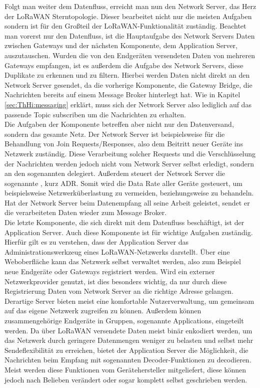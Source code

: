 Folgt man weiter dem Datenfluss, erreicht man nun den Network Server, das Herz der LoRaWAN Sterntopologie. Dieser bearbeitet nicht nur die meisten Aufgaben sondern ist für den Großteil der LoRaWAN-Funktionalität zuständig. Beachtet man vorerst nur den Datenfluss, ist die Hauptaufgabe des Network Servers Daten zwischen Gateways und der nächsten Komponente, dem Application Server, auszutauschen. Wurden die von den Endgeräten versendeten Daten von mehreren Gateways empfangen, ist es außerdem die Aufgabe des Network Servers, diese Duplikate zu erkennen und zu filtern. Hierbei werden Daten nicht direkt an den Network Server gesendet, da die vorherige Komponente, die Gateway Bridge, die Nachrichten bereits auf einem Message Broker hinterlegt hat. Wie in Kapitel \ref{sec:ThHi:messaging} erklärt, muss sich der Network Server also lediglich auf das passende Topic subscriben um die Nachrichten zu erhalten. \\
Die Aufgaben der Komponente betreffen aber nicht nur den Datenversand, sondern das gesamte Netz. Der Network Server ist beispielsweise für die Behandlung von Join Requests/Responses, also dem Beitritt neuer Geräte ins Netzwerk zuständig. Diese Verarbeitung solcher Requests und die Verschlüsselung der Nachrichten werden jedoch nicht vom Network Server selbst erledigt, sondern an den sogenannten  delegiert. Außerdem steuert der Network Server die sogenannte , kurz ADR. Somit wird die Data Rate aller Geräte gesteuert, um beispielsweise Netzwerküberlastung zu vermeiden, beziehungsweise zu behandeln. Hat der Network Server beim Datenempfang all seine Arbeit geleistet, sendet er die verarbeiteten Daten wieder zum Message Broker. \\
Die letzte Komponente, die sich direkt mit dem Datenfluss beschäftigt, ist der Application Server. Auch diese Komponente ist für wichtige Aufgaben zuständig. Hierfür gilt es zu verstehen, dass der Application Server das Administrationswerkzeug eines LoRaWAN-Netzwerks darstellt. Über eine Weboberfläche kann das Netzwerk selbst verwaltet werden, also zum Beispiel neue Endgeräte oder Gateways registriert werden. Wird ein externer Netzwerkprovider genutzt, ist dies besonders wichtig, da nur durch diese Registrierung Daten vom Network Server an die richtige Adresse gelangen. Derartige Server bieten meist eine komfortable Nutzerverwaltung, um gemeinsam auf das eigene Netzwerk zugreifen zu können. Außerdem können zusammengehörige Endgeräte in Gruppen, sogenannte Applications, eingeteilt werden. Da über LoRaWAN versendete Daten meist binär enkodiert werden, um das Netzwerk durch geringere Datenmengen weniger zu belasten und selbst mehr Sendeflexibilität zu erreichen, bietet der Application Server die Möglichkeit, die Nachrichten beim Empfang mit sogenannten Decoder-Funktionen zu decodieren. Meist werden diese Funktionen vom Gerätehersteller mitgeliefert, diese können jedoch nach Belieben verändert oder sogar komplett selbst geschrieben werden. 

